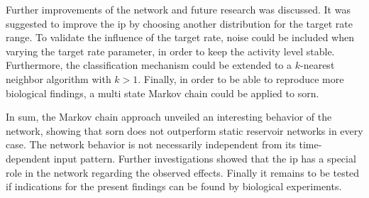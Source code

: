 Further improvements of the network and future research was discussed. It was suggested to improve the \acl{ip} by choosing another distribution for the target rate range. To validate the influence of the target rate, noise could be included when varying the target rate parameter, in order to keep the activity level stable. Furthermore, the classification mechanism could be extended to a $k$-nearest neighbor algorithm with $k>1$. Finally, in order to be able to reproduce more biological findings, a multi state Markov chain could be applied to \acs{sorn}.

In sum, the Markov chain approach unveiled an interesting behavior of the network, showing that \acs{sorn} does not outperform static reservoir networks in every case. The network behavior is not necessarily independent from its time-dependent input pattern. Further investigations showed that the \acl{ip} has a special role in the network regarding the observed effects. Finally it remains to be tested if indications for the present findings can be found by biological experiments.



